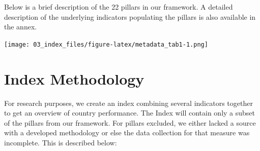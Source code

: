 \documentclass[
]{article}
\begin{document}
Below is a brief description of the 22 pillars in our framework. A detailed description of the underlying indicators populating the pillars is also available in the annex.

\texttt{[image: 03\_index\_files/figure-latex/metadata\_tab1-1.png]}

\hypertarget{index-methodology}{%
\section{Index Methodology}\label{index-methodology}}

For research purposes, we create an index combining several indicators together to get an overview of country performance. The Index will contain only a subset of the pillars from our framework. For pillars excluded, we either lacked a source with a developed methodology or else the data collection for that measure was incomplete. This is described below:
\end{document}
